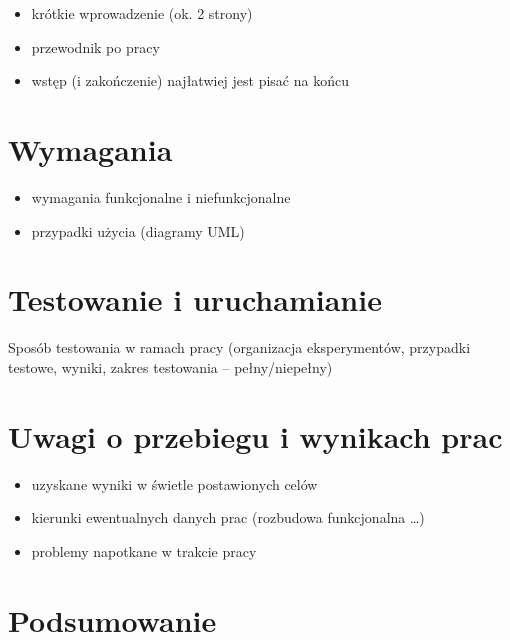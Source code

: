 \documentclass[a4paper]{book}
\begin{document}
\begin{itemize}
\item krótkie wprowadzenie (ok. 2 strony)
\item przewodnik po pracy
\item wstęp (i zakończenie) najłatwiej jest pisać na końcu
\end{itemize}



\chapter{Wymagania}
\begin{itemize}
\item wymagania funkcjonalne i niefunkcjonalne
\item przypadki użycia (diagramy UML)
\end{itemize}




\chapter{Testowanie i uruchamianie}
Sposób testowania w ramach pracy (organizacja eksperymentów, przypadki testowe, wyniki, zakres testowania -- pełny/niepełny)

\chapter{Uwagi o przebiegu i wynikach prac}
\begin{itemize}
\item uzyskane wyniki w świetle postawionych celów
\item kierunki ewentualnych danych prac (rozbudowa funkcjonalna \ldots)
\item problemy napotkane w trakcie pracy
\end{itemize}	

\chapter{Podsumowanie}


\nocite{*}
\printbibliography
\end{document}
